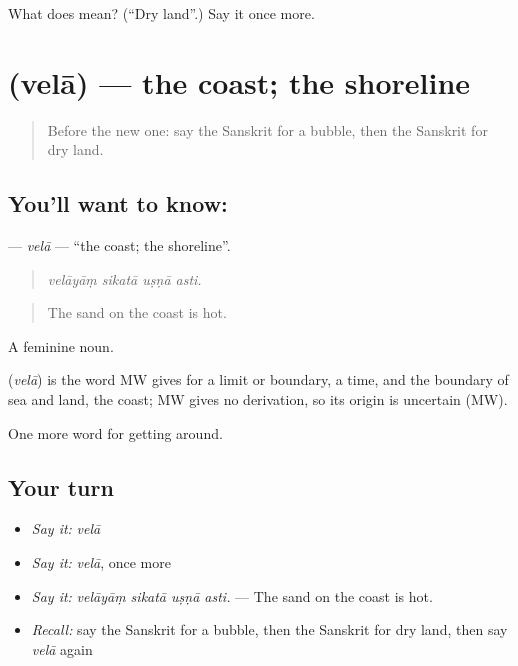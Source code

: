 \begin{tcolorbox}[breakable,colback=teal!4,colframe=teal!35!black,title={Before you move on}]
What does  mean? (\textquotedblleft{}Dry land\textquotedblright{}.) Say it once more.
\end{tcolorbox}
\section[\texorpdfstring{\sk{वेला} (velā)}{वेला (velā)}]{ (velā) — the coast; the shoreline}

\label{lesson:SA-C417-vela}



\begin{quote}
Before the new one: say the Sanskrit for a bubble, then the Sanskrit for dry land.
\end{quote}

\subsection*{You'll want to know: }
\textbf{} — \emph{velā} — \textquotedblleft{}the coast; the shoreline\textquotedblright{}.

\begin{quote}
   
\end{quote}

\begin{quote}
\emph{velāyāṃ sikatā uṣṇā asti.}
\end{quote}

\begin{quote}
The sand on the coast is hot.
\end{quote}

A feminine noun.

\begin{cousinweb}
\textbf{} (\emph{velā}) is the word MW gives for a limit or boundary, a time, and the boundary of sea and land, the coast; MW gives no derivation, so its origin is uncertain (MW).
\end{cousinweb}

\begin{grammarlens}[title={What you've built}]
One more word for getting around.
\end{grammarlens}

\subsection*{Your turn}
\begin{itemize}
\raggedright
  \item \emph{Say it:} \emph{velā}
  \item \emph{Say it:} \emph{velā}, once more
  \item \emph{Say it:} \emph{velāyāṃ sikatā uṣṇā asti.} — The sand on the coast is hot.
  \item \emph{Recall:} say the Sanskrit for a bubble, then the Sanskrit for dry land, then say \emph{velā} again
\end{itemize}

